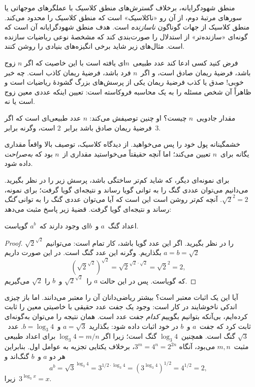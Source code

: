 \documentclass[../../../include/open-logic-section]{subfiles}
\begin{document}


منطق شهودگرایانه، برخلاف گسترش‌های منطق کلاسیک با عملگرهای موجهاتی یا
سورهای مرتبهٔ دوم، از آن رو «ناکلاسیک» است که منطق کلاسیک را محدود
می‌کند. منطق کلاسیک از جهات گوناگون \emph{ناسازنده} است. هدف منطق
شهودگرایانه آن است که گونه‌ای «سازنده‌تر» از استدلال را صورت‌بندی کند
که مشخصهٔ نوعی ریاضیات سازنده است. مثال‌های زیر شاید برخی انگیزه‌های
بنیادی را روشن کنند.

فرض کنید کسی ادعا کند عدد طبیعی~$n$ای یافته است با این خاصیت که اگر
$n$ زوج باشد، فرضیهٔ ریمان صادق است، و اگر~$n$ فرد باشد، فرضیهٔ ریمان
کاذب است. چه خبر خوبی!{} صدق یا کذب فرضیهٔ ریمان یکی از پرسش‌های بزرگ
گشودهٔ ریاضیات است و ظاهراً آن شخص مسئله را به یک محاسبه فروکاسته است:
تعیین اینکه عددی معین زوج است یا نه.

مقدار جادویی~$n$ چیست؟ او چنین توصیفش می‌کند: $n$ عدد طبیعی‌ای است که
اگر فرضیهٔ ریمان صادق باشد برابر~$2$ است، وگرنه برابر~$3$.

خشمگینانه پول خود را پس می‌خواهید. از دیدگاه کلاسیک، توصیف بالا واقعاً
مقداری یگانه برای~$n$ تعیین می‌کند؛ اما آنچه حقیقتاً می‌خواستید مقداری
از~$n$ بود که \emph{به‌صراحت} داده شود.

برای نمونه‌ای دیگر، که شاید کم‌تر ساختگی باشد، پرسش زیر را در نظر
بگیرید. می‌دانیم می‌توان عددی گنگ را به توانی گویا رساند و نتیجه‌ای گویا
گرفت؛ برای نمونه، $\sqrt{2}^2 = 2$. آنچه کم‌تر روشن است این است که آیا
می‌توان عددی گنگ را به توانی \emph{گنگ} رساند و نتیجه‌ای گویا گرفت.
قضیهٔ زیر پاسخ مثبت می‌دهد:

\begin{thm}
اعداد گنگ~$a$ و~$b$ای وجود دارند که~$a^b$ گویاست.
\end{thm}

\begin{proof}
$\sqrt{2}^{\sqrt{2}}$ را در نظر بگیرید. اگر این عدد گویا باشد، کار
تمام است: می‌توانیم $a = b = \sqrt{2}$ بگذاریم. وگرنه این عدد گنگ
است. در این صورت داریم
\[
(\sqrt{2}^{\sqrt{2}})^{\sqrt{2}} = \sqrt{2}^{\sqrt{2} \cdot
  \sqrt{2}} = \sqrt{2}^2 = 2,
\]
که گویاست. پس در این حالت $a$ را~$\sqrt{2}^{\sqrt{2}}$ و~$b$ را
$\sqrt 2$ می‌گیریم.
\end{proof}

آیا این یک اثبات معتبر است؟ بیشتر ریاضی‌دانان آن را معتبر می‌دانند.
اما باز چیزی اندکی ناخوشایند در کار است: وجود یک جفت عدد حقیقی با
خاصیتی معین را ثابت کرده‌ایم، بی‌آنکه بتوانیم بگوییم \emph{کدام} جفت
عدد است. همان نتیجه را می‌توان به‌گونه‌ای ثابت کرد که جفت~$a$ و~$b$
در خود اثبات داده شود: بگذارید $a = \sqrt{3}$ و~$b = \log_3 4$.
عدد~$\sqrt3$ گنگ است. همچنین~$\log_3 4$ گنگ است؛ زیرا اگر
$\log_3 4=m/n$ برای اعداد طبیعی مثبت~$m,n$ می‌بود، آنگاه
$3^m=4^n=2^{2n}$، برخلاف یکتایی تجزیه به عوامل اول. بنابراین هر دو
$a$ و~$b$ گنگ‌اند و
\[
a^b = \sqrt{3}^{\log_3 4} = 3^{1/2 \cdot \log_3 4} = (3^{\log_3
  4})^{1/2} = 4^{1/2}= 2,
\]
زیرا~$3^{\log_3 x} = x$.
\end{document}
